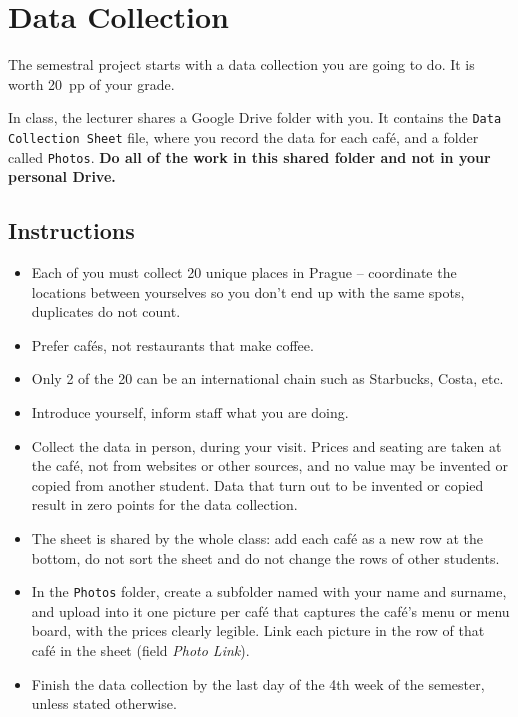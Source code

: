 \documentclass[11pt,a4paper]{article}
\begin{document}
\clearpage
\section{Data Collection}\label{sec:collection}
The semestral project starts with a data collection you are going to do. It is worth 20~pp of your grade. 

In class, the lecturer shares a Google Drive folder with you. It contains the \texttt{Data Collection Sheet} file, where you record the data for each caf\'e, and a folder called \texttt{Photos}. \textbf{Do all of the work in this shared folder and not in your personal Drive.}

\subsection*{Instructions}

\begin{itemize}
\item Each of you must collect 20 unique places in Prague -- coordinate the locations between yourselves so you don't end up with the same spots, duplicates do not count.
\item Prefer caf\'es, not restaurants that make coffee.
\item Only 2 of the 20 can be an international chain such as Starbucks, Costa, etc.
\item Introduce yourself, inform staff what you are doing.
\item Collect the data in person, during your visit. Prices and seating are taken at the caf\'e, not from websites or other sources, and no value may be invented or copied from another student. Data that turn out to be invented or copied result in zero points for the data collection.
\item The sheet is shared by the whole class: add each caf\'e as a new row at the bottom, do not sort the sheet and do not change the rows of other students.
\item In the \texttt{Photos} folder, create a subfolder named with your name and surname, and upload into it one picture per caf\'e that captures the caf\'e's menu or menu board, with the prices clearly legible. Link each picture in the row of that caf\'e in the sheet (field \emph{Photo Link}).
\item Finish the data collection by the last day of the 4th week of the semester, unless stated otherwise.
\end{itemize}
\end{document}
